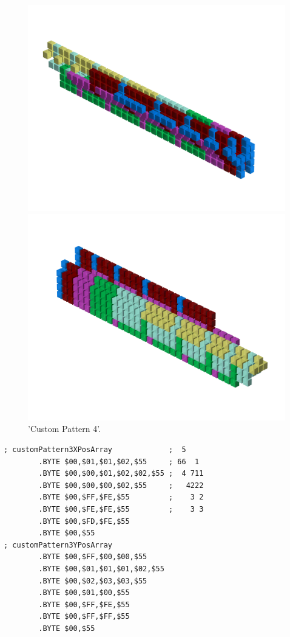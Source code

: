 \begin{figure}[H]
    \centering
    \begin{adjustbox}{width=12cm,center}
      \includegraphics[width=12cm]{src/patterns/pattern11-45.png}%
    \end{adjustbox}
    \begin{adjustbox}{width=12cm,margin=0cm -4cm}
      \includegraphics[width=12cm]{src/patterns/pattern11-225.png}%
    \end{adjustbox}
\caption{'Custom Pattern 4'.}
\end{figure}
\clearpage

\begin{lstlisting}
; customPattern3XPosArray             ;  5    
        .BYTE $00,$01,$01,$02,$55     ; 66  1 
        .BYTE $00,$00,$01,$02,$02,$55 ;  4 711
        .BYTE $00,$00,$00,$02,$55     ;   4222
        .BYTE $00,$FF,$FE,$55         ;    3 2
        .BYTE $00,$FE,$FE,$55         ;    3 3
        .BYTE $00,$FD,$FE,$55
        .BYTE $00,$55
; customPattern3YPosArray
        .BYTE $00,$FF,$00,$00,$55
        .BYTE $00,$01,$01,$01,$02,$55
        .BYTE $00,$02,$03,$03,$55
        .BYTE $00,$01,$00,$55
        .BYTE $00,$FF,$FE,$55
        .BYTE $00,$FF,$FF,$55
        .BYTE $00,$55
\end{lstlisting}


